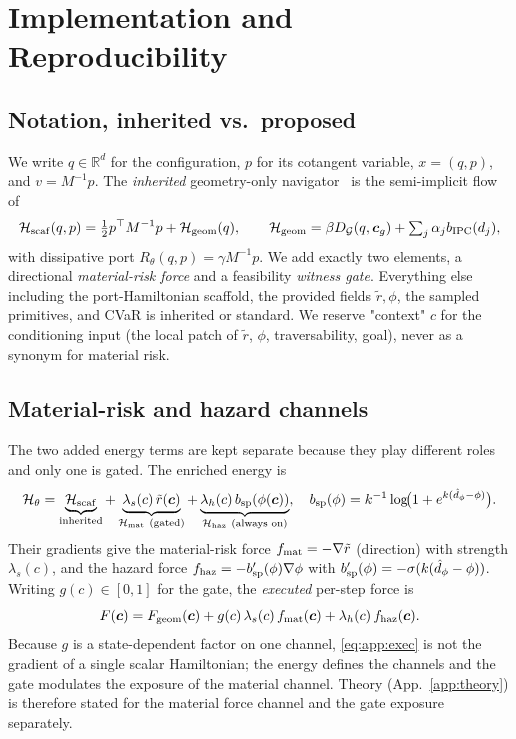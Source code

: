 
\providecommand{\Kdef}{16}
\providecommand{\needsnum}[1]{\textcolor{red}{\textbf{[NEED: #1]}}}
\providecommand{\reviewnote}[1]{\textcolor{red}{\textbf{[CHECK: #1]}}}
\providecommand{\Ham}{\mathcal{H}}\providecommand{\Pos}{q}\providecommand{\Mom}{p}\providecommand{\Mass}{M}
\providecommand{\cvar}[1]{\mathrm{CVaR}_{#1}}

\section{Implementation and Reproducibility}
\label{app:impl}

\subsection{Notation, inherited vs.\ proposed}
\label{app:setup}
We write $q\in\mathbb R^d$ for the configuration, $p$ for its cotangent variable, $x=(q,p)$, and $v=M^{-1}p$. The \emph{inherited} geometry-only navigator~\citep{ellendula2025grlsnam} is the semi-implicit flow of
\[
  \Ham_{\rm scaf}(q,p)=\tfrac12 p^\top M^{-1}p+\Ham_{\rm geom}(q),
  \qquad
  \Ham_{\rm geom}=\beta D_{\mathcal G}(q,\vec c_g)+\textstyle\sum_j\alpha_j b_{\rm IPC}(d_j),
\]
with dissipative port $R_\theta(q,p)=\gamma M^{-1}p$. We add exactly two elements, a directional \emph{material-risk force} and a feasibility \emph{witness gate}. Everything else including the port-Hamiltonian scaffold, the provided fields $\tilde r,\phi$, the sampled primitives, and CVaR is inherited or standard. We reserve "context" $c$ for the conditioning input (the local patch of $\tilde r$, $\phi$, traversability, goal), never as a synonym for material risk.

\subsection{Material-risk and hazard channels}
\label{app:channels}
The two added energy terms are kept separate because they play different roles and only one is gated. The enriched energy is
\[
  \Ham_\theta
  =\underbrace{\Ham_{\rm scaf}}_{\text{inherited}}
  +\underbrace{\lambda_s(c)\,\tilde r(\vec c)}_{\Ham_{\rm mat}\ \text{(gated)}}
  +\underbrace{\lambda_h(c)\,b_{\rm sp}(\phi(\vec c))}_{\Ham_{\rm haz}\ \text{(always on)}},
  \quad
  b_{\rm sp}(\phi)=k^{-1}\log\!\bigl(1+e^{k(\hat d_\phi-\phi)}\bigr).
\]
Their gradients give the material-risk force $f_{\rm mat}=-\nabla\tilde r$ (direction) with strength $\lambda_s(c)$, and the hazard force $f_{\rm haz}=-b_{\rm sp}'(\phi)\nabla\phi$ with $b_{\rm sp}'(\phi)=-\sigma(k(\hat d_\phi-\phi))$. Writing $g(c)\in[0,1]$ for the gate, the \emph{executed} per-step force is
\begin{equation}
  F(\vec c)=F_{\rm geom}(\vec c)+g(c)\,\lambda_s(c)\,f_{\rm mat}(\vec c)+\lambda_h(c)\,f_{\rm haz}(\vec c).
  \label{eq:app:exec}
\end{equation}
Because $g$ is a state-dependent factor on one channel, \eqref{eq:app:exec} is not the gradient of a single scalar Hamiltonian; the energy defines the channels and the gate modulates the exposure of the material channel. Theory (App.~\ref{app:theory}) is therefore stated for the material force channel and the gate exposure separately.

